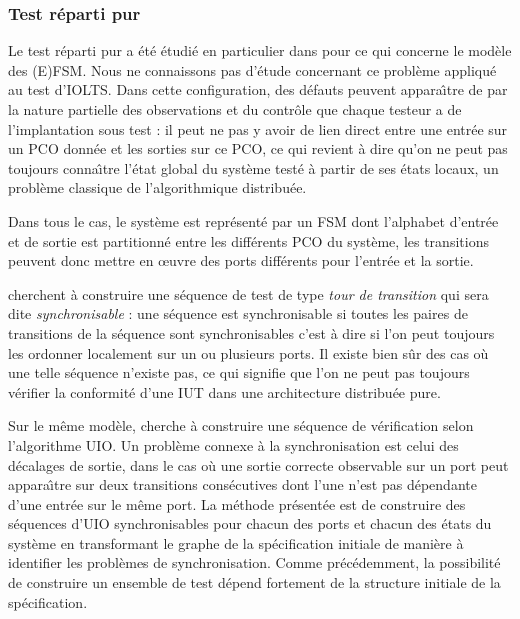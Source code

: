 \subsubsection{Test r\'eparti pur}

Le test r\'eparti pur a \'et\'e \'etudi\'e en particulier dans
\cite{luo-tgen-dist,sarikaya-proto-test,hierons-check-synch} pour ce
qui concerne le mod\`ele des (E)\textsf{FSM}. Nous ne connaissons pas
d'\'etude concernant ce probl\`eme appliqu\'e au test d'\textsf{IOLTS}.
Dans cette configuration, des d\'efauts peuvent appara\^{\i}tre de par
la nature partielle des observations et du contr\^ole que chaque
testeur a de l'implantation sous test : il peut ne pas y avoir de lien
direct entre une entr\'ee sur un \textsf{PCO} donn\'ee et les sorties sur ce
PCO, ce qui revient \`a dire qu'on ne peut pas toujours conna\^{\i}tre
l'\'etat global du syst\`eme test\'e \`a partir de ses \'etats
locaux, un probl\`eme classique de l'algorithmique distribu\'ee. 

Dans tous le cas, le syst\`eme est repr\'esent\'e par un \textsf{FSM} dont
l'alphabet d'entr\'ee et de sortie est partitionn\'e entre les
diff\'erents \textsf{PCO} du syst\`eme, les transitions peuvent donc mettre
en \oe uvre des ports diff\'erents pour l'entr\'ee et la sortie. 

\cite{luo-tgen-dist,sarikaya-proto-test} cherchent \`a construire une
s\'equence de test de type \emph{tour de transition} qui sera dite
\emph{synchronisable} : une s\'equence est synchronisable si toutes
les paires de transitions  de la
s\'equence sont synchronisables c'est \`a dire si l'on peut toujours
les ordonner localement sur un ou plusieurs ports. Il existe bien s\^ur des cas o\`u une telle s\'equence
n'existe pas, ce qui signifie que l'on ne peut pas toujours
v\'erifier la conformit\'e d'une \textsf{IUT} dans une architecture
distribu\'ee pure. 

Sur le m\^eme mod\`ele,
\cite{hierons-check-synch} cherche \`a construire une s\'equence de
v\'erification selon l'algorithme \textsf{UIO}. Un probl\`eme connexe \`a la
synchronisation est celui des d\'ecalages de sortie, dans le cas
o\`u une sortie correcte observable sur un port peut appara\^{\i}tre
sur deux transitions cons\'ecutives dont l'une n'est pas d\'ependante
d'une entr\'ee sur le m\^eme port. La m\'ethode pr\'esent\'ee
est de construire des s\'equences d'UIO synchronisables pour chacun
des ports et chacun des \'etats du syst\`eme en transformant le
graphe de la sp\'ecification initiale de mani\`ere \`a identifier
les probl\`emes de synchronisation.  Comme pr\'ec\'edemment, la
possibilit\'e de construire un ensemble de test d\'epend fortement
de la structure initiale de la sp\'ecification.

